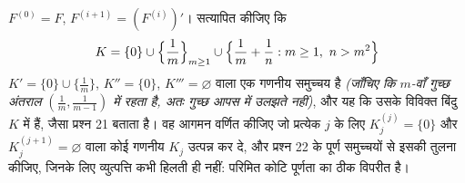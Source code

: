 \begin{problem}
\begin{enumerate}[resume]
        $F^{(0)} = F$, $F^{(i+1)}
        = (F^{(i)})'$। सत्यापित कीजिए कि
        \[
        K = \{0\} \cup \Bigl\{\frac1m\Bigr\}_{m \geq 1} \cup
        \Bigl\{\frac1m + \frac1n : m \geq 1,\ n > m^2\Bigr\}
        \]
        $K' = \{0\} \cup
        \{\frac1m\}$, $K'' = \{0\}$, $K''' = \varnothing$ वाला एक गणनीय  समुच्चय है
        \emph{(जाँचिए कि $m$-वाँ गुच्छ अंतराल $(\frac1m, \frac1{m-1})$ में रहता
        है, अतः गुच्छ आपस में उलझते नहीं)}, और यह कि उसके विविक्त
        बिंदु $K$ में  हैं, जैसा प्रश्न 21 बताता है। वह आगमन
        वर्णित कीजिए जो प्रत्येक $j$ के लिए $K_j^{(j)} = \{0\}$ और $K_j^{(j+1)} =
        \varnothing$ वाला
        कोई गणनीय  $K_j$ उत्पन्न कर दे, और प्रश्न 22 के पूर्ण
        समुच्चयों से इसकी तुलना कीजिए, जिनके लिए व्युत्पत्ति कभी
        हिलती ही नहीं: परिमित कोटि पूर्णता का ठीक विपरीत है।
\end{enumerate}
\end{problem}
